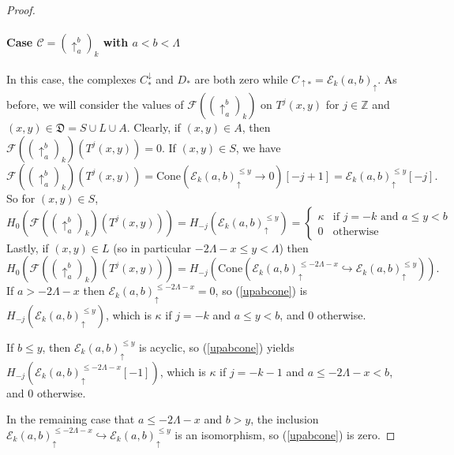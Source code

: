 \documentclass[11pt]{amsart}
\theoremstyle{definition}
\theoremstyle{remark}
\numberwithin{equation}{section}
\def\Z{\mathbb{Z}}
\begin{document}
\begin{proof}
\paragraph{\textbf{Case} $\mathcal{C}=\left(\uparrow_{a}^{b}\right)_k$ with $a<b<\Lambda$} In this case, the complexes $C^{\downarrow}_{*}$ and $D_*$ are both zero while $C_{\uparrow*}=\mathcal{E}_k(a,b)_{\uparrow}$.  As before, we will consider the values of $\mathcal{F}\left(\left(\uparrow_{a}^{b}\right)_k\right)$ on $T^{j}(x,y)$ for $j\in \Z$ and $(x,y)\in\mathfrak{D}=S\cup L\cup A$.  Clearly, if $(x,y)\in A$, then $\mathcal{F}\left(\left(\uparrow_{a}^{b}\right)_k\right)(T^j(x,y))=0$.  If $(x,y)\in S$, we have \[ \mathcal{F}\left(\left(\uparrow_{a}^{b}\right)_k\right)(T^j(x,y))=\mathrm{Cone}\left(\mathcal{E}_k(a,b)_{\uparrow}^{\leq y}\to 0\right)[-j+1]=\mathcal{E}_k(a,b)_{\uparrow}^{\leq y}[-j]. \] So for $(x,y)\in S$, \begin{equation}\label{upabS} H_0\left(\mathcal{F}\left(\left(\uparrow_{a}^{b}\right)_k\right)(T^j(x,y)) \right)=H_{-j}\left(\mathcal{E}_k(a,b)_{\uparrow}^{\leq y}\right)=\left\{\begin{array}{ll}\kappa & \mbox{if }j=-k\mbox{ and } a\leq y<b \\ 0 & \mbox{otherwise}\end{array}\right. \end{equation}
Lastly, if $(x,y)\in L$ (so in particular $-2\Lambda-x\leq y<\Lambda$) then \begin{equation}\label{upabcone} H_0\left(\mathcal{F}\left(\left(\uparrow_{a}^{b}\right)_k\right)(T^j(x,y))\right) = H_{-j}\left(\mathrm{Cone}\left(\mathcal{E}_k(a,b)_{\uparrow}^{\leq -2\Lambda-x}\hookrightarrow \mathcal{E}_k(a,b)_{\uparrow}^{\leq y} \right)\right). \end{equation}
If $a> -2\Lambda-x$ then $\mathcal{E}_{k}(a,b)_{\uparrow}^{\leq -2\Lambda-x}=0$, so (\ref{upabcone}) is $H_{-j}\left(\mathcal{E}_k(a,b)_{\uparrow}^{\leq y}\right)$, which is $\kappa$ if $j=-k$ and $a\leq y<b$, and $0$ otherwise.  

If $b\leq y$, then  $\mathcal{E}_{k}(a,b)_{\uparrow}^{\leq y}$ is acyclic, so (\ref{upabcone}) yields $H_{-j}(\mathcal{E}_{k}(a,b)_{\uparrow}^{\leq -2\Lambda-x}[-1])$, which is $\kappa$ if $j=-k-1$ and $a\leq -2\Lambda-x<b$, and $0$ otherwise.  

In the remaining case that $a\leq -2\Lambda-x$ and $b>y$, the inclusion $\mathcal{E}_k(a,b)_{\uparrow}^{\leq-2\Lambda-x}\hookrightarrow \mathcal{E}_{k}(a,b)_{\uparrow}^{\leq y}$ is an isomorphism, so (\ref{upabcone}) is zero.


\end{proof}
\end{document}

